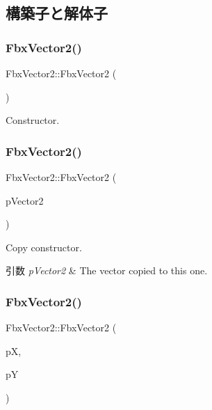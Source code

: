 \subsection{構築子と解体子}
\mbox{\label{class_fbx_vector2_afb0716473e400a06bd41f337d5d9d8d2}} 
\subsubsection{\texorpdfstring{Fbx\+Vector2()}{FbxVector2()}\hspace{0.1cm}{\footnotesize\ttfamily [1/3]}}
{\footnotesize\ttfamily Fbx\+Vector2\+::\+Fbx\+Vector2 (\begin{DoxyParamCaption}{ }\end{DoxyParamCaption})}



Constructor. 

\mbox{\label{class_fbx_vector2_ae3e34456e4fbf24627590da182d3489f}} 
\subsubsection{\texorpdfstring{Fbx\+Vector2()}{FbxVector2()}\hspace{0.1cm}{\footnotesize\ttfamily [2/3]}}
{\footnotesize\ttfamily Fbx\+Vector2\+::\+Fbx\+Vector2 (\begin{DoxyParamCaption}\item[{const \hyperlink{class_fbx_vector2}{Fbx\+Vector2} \&}]{p\+Vector2 }\end{DoxyParamCaption})}

Copy constructor. 
\begin{DoxyParams}{引数}
{\em p\+Vector2} & The vector copied to this one. \\
\hline
\end{DoxyParams}
\mbox{\label{class_fbx_vector2_ae2d1e80f75a1566de936cfa8532a49b3}} 
\subsubsection{\texorpdfstring{Fbx\+Vector2()}{FbxVector2()}\hspace{0.1cm}{\footnotesize\ttfamily [3/3]}}
{\footnotesize\ttfamily Fbx\+Vector2\+::\+Fbx\+Vector2 (\begin{DoxyParamCaption}\item[{double}]{pX,  }\item[{double}]{pY }\end{DoxyParamCaption})}

